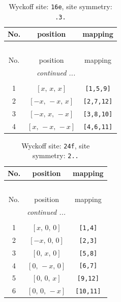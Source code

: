 \documentclass[fleqn,8pt]{jsarticle}
\begin{document}
\begin{longtable}{ccc}
\caption{Wyckoff site: {\tt 16e}, site symmetry: {\tt .3.}}
 \\
 \hline \hline
No. & position & mapping \\ \hline \endfirsthead

\multicolumn{2}{l}{\tablename\ \thetable{}} \\
 \hline \hline
No. & position & mapping \\ \hline \endhead

 \hline \hline
\multicolumn{2}{r}{\footnotesize\it continued ...} \\ \endfoot

 \hline \hline
\multicolumn{2}{r}{} \\ \endlastfoot

1 & $\left[ x,\, x,\, x \right]$ & {\tt [1,5,9]} \\ \hline
2 & $\left[ - x,\, - x,\, x \right]$ & {\tt [2,7,12]} \\ \hline
3 & $\left[ - x,\, x,\, - x \right]$ & {\tt [3,8,10]} \\ \hline
4 & $\left[ x,\, - x,\, - x \right]$ & {\tt [4,6,11]} \\
\end{longtable}
\renewcommand{\arraystretch}{1.2}
\begin{longtable}{ccc}
\caption{Wyckoff site: {\tt 24f}, site symmetry: {\tt 2..}}
 \\
 \hline \hline
No. & position & mapping \\ \hline \endfirsthead

\multicolumn{2}{l}{\tablename\ \thetable{}} \\
 \hline \hline
No. & position & mapping \\ \hline \endhead

 \hline \hline
\multicolumn{2}{r}{\footnotesize\it continued ...} \\ \endfoot

 \hline \hline
\multicolumn{2}{r}{} \\ \endlastfoot

1 & $\left[ x,\, 0,\, 0 \right]$ & {\tt [1,4]} \\ \hline
2 & $\left[ - x,\, 0,\, 0 \right]$ & {\tt [2,3]} \\ \hline
3 & $\left[ 0,\, x,\, 0 \right]$ & {\tt [5,8]} \\ \hline
4 & $\left[ 0,\, - x,\, 0 \right]$ & {\tt [6,7]} \\ \hline
5 & $\left[ 0,\, 0,\, x \right]$ & {\tt [9,12]} \\ \hline
6 & $\left[ 0,\, 0,\, - x \right]$ & {\tt [10,11]} \\
\end{longtable}
\end{document}

